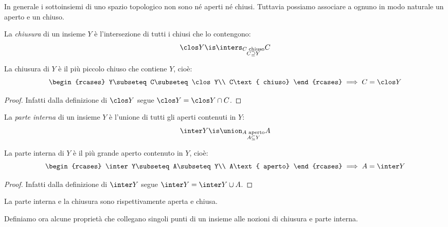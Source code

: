 
In generale i sottoinsiemi di uno spazio topologico non sono né aperti né chiusi. Tuttavia possiamo associare a ognuno in modo naturale un aperto e un chiuso.

\begin{defn}[Chiusura]
	La \emph{chiusura} di un insieme $Y$ è l'intersezione di tutti i chiusi che lo contengono:
	\[\clos Y\is\inters_{\substack{C\text{ chiuso}\\C\supseteq Y}}C\]
\end{defn}

\begin{prop}
	La chiusura di $Y$ è il più piccolo chiuso che contiene $Y$, cioè:
	\[\begin{rcases}
		Y\subseteq C\subseteq\clos Y\\
		C\text{ chiuso}
	\end{rcases}\implies C=\clos Y\]
\end{prop}

\begin{proof}
	Infatti dalla definizione di $\clos Y$ segue $\clos Y=\clos Y\cap C$.
\end{proof}

\begin{defn}
	La \emph{parte interna} di un insieme $Y$ è l'unione di tutti gli aperti contenuti in $Y$:
	\[\inter Y\is\union_{\substack{A\text{ aperto}\\A\subseteq Y}}A\]
\end{defn}

\begin{prop}
	La parte interna di $Y$ è il più grande aperto contenuto in $Y$, cioè:
	\[\begin{rcases}
		\inter Y\subseteq A\subseteq Y\\
		A\text{ aperto}
	\end{rcases}\implies A=\inter Y\]
\end{prop}

\begin{proof}
	Infatti dalla definizione di $\inter Y$ segue $\inter Y=\inter Y\cup A$.
\end{proof}

\begin{oss}
	La parte interna e la chiusura sono rispettivamente aperta e chiusa.
\end{oss}

Definiamo ora alcune proprietà che collegano singoli punti di un insieme alle nozioni di chiusura e parte interna.

